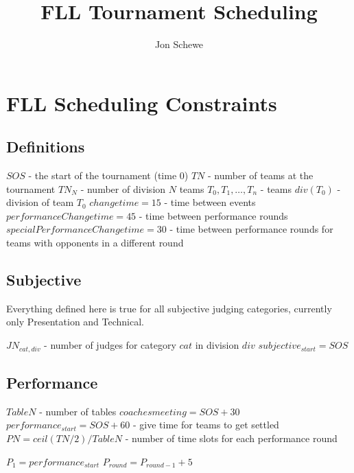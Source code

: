 \documentclass[letterpaper,11pt]{report}
\title{FLL Tournament Scheduling}
\author{Jon Schewe}
\begin{document}
\maketitle

\chapter{FLL Scheduling Constraints}

\section{Definitions}

\begin{algorithmic}
\STATE $SOS$ - the start of the tournament (time 0)
\STATE $TN$ - number of teams at the tournament
\STATE $TN_{N}$ - number of division $N$ teams
\STATE $T_{0}, T_{1}, \dots, T_{n}$ - teams
\STATE $div(T_{0})$ - division of team $T_{0}$
\STATE $changetime = 15$ - time between events
\STATE $performanceChangetime = 45$ - time between performance rounds
\STATE $specialPerformanceChangetime = 30$ - time between performance
rounds for teams with opponents in a different round
\end{algorithmic}


\section{Subjective}

Everything defined here is true for all subjective judging categories, currently only Presentation and Technical.

\begin{algorithmic}
\STATE $JN_{cat,div}$ - number of judges for category $cat$ in division $div$
\STATE $subjective_{start} = SOS$
\end{algorithmic}

\section{Performance}
\begin{algorithmic}
\STATE $TableN$ - number of tables
\STATE $coaches meeting = SOS + 30$
\STATE $performance_{start} = SOS + 60$ - give time for teams to get settled
\STATE $PN = ceil(TN / 2) / TableN$ - number of time slots for each performance round
\end{algorithmic}

\begin{algorithmic}
\STATE $P_{1} = performance_{start}$
  \STATE $P_{round} = P_{round-1} + 5$
\ENDFOR
\end{algorithmic}
\end{document}
